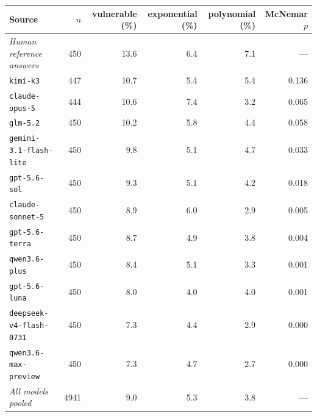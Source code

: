 \begin{tabular}{lrrrrr}
\toprule
Source & $n$ & vulnerable (\%) & exponential (\%) & polynomial (\%) & McNemar $p$ \\
\midrule
\textit{Human reference answers} & 450 & 13.6 & 6.4 & 7.1 & --- \\
\midrule
\texttt{kimi-k3} & 447 & 10.7 & 5.4 & 5.4 & 0.136 \\
\texttt{claude-opus-5} & 444 & 10.6 & 7.4 & 3.2 & 0.065 \\
\texttt{glm-5.2} & 450 & 10.2 & 5.8 & 4.4 & 0.058 \\
\texttt{gemini-3.1-flash-lite} & 450 & 9.8 & 5.1 & 4.7 & 0.033 \\
\texttt{gpt-5.6-sol} & 450 & 9.3 & 5.1 & 4.2 & 0.018 \\
\texttt{claude-sonnet-5} & 450 & 8.9 & 6.0 & 2.9 & 0.005 \\
\texttt{gpt-5.6-terra} & 450 & 8.7 & 4.9 & 3.8 & 0.004 \\
\texttt{qwen3.6-plus} & 450 & 8.4 & 5.1 & 3.3 & 0.001 \\
\texttt{gpt-5.6-luna} & 450 & 8.0 & 4.0 & 4.0 & 0.001 \\
\texttt{deepseek-v4-flash-0731} & 450 & 7.3 & 4.4 & 2.9 & 0.000 \\
\texttt{qwen3.6-max-preview} & 450 & 7.3 & 4.7 & 2.7 & 0.000 \\
\midrule
\textit{All models pooled} & 4941 & 9.0 & 5.3 & 3.8 & --- \\
\bottomrule
\end{tabular}
